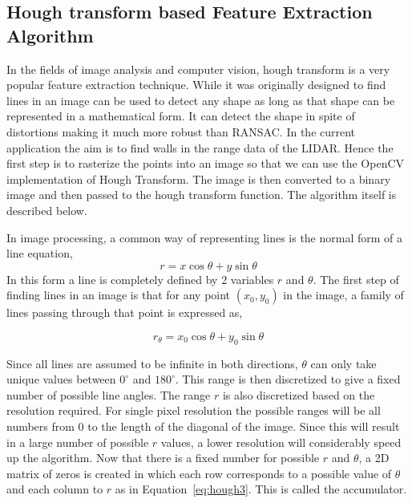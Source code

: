 \subsection{Hough transform based Feature Extraction Algorithm}
\label{sec:hough}
In the fields of image analysis and computer vision, hough transform is a very popular feature extraction technique\cite{Stockman2001}. While it was originally designed to find lines in an image can be used to detect any shape as long as that shape can be represented in a mathematical form\cite{Duda1972}. It can detect the shape in spite of distortions making it much more robust than RANSAC\cite{Hu1998}. In the current application the aim is to find walls in the range data of the LIDAR. Hence the first step is to rasterize the points into an image so that we can use the OpenCV implementation of Hough Transform. The image is then converted to a binary image and then passed to the hough transform function. The algorithm itself is described below.

In image processing, a common way of representing lines is the normal form of a line equation, 
\begin{equation}[h!]
r=x\cos\theta+y\sin\theta
\label{eq:hough1}
\end{equation}
In this form a line is completely defined by 2 variables $ r $ and  $ \theta $. The first step of finding lines in an image is that for any point $ (x_0,y_0) $ in the image, a family of lines passing through that point is expressed as,

\begin{equation}[h!]
r_\theta=x_0\cos\theta+y_0\sin\theta
\label{eq:hough2}
\end{equation}

Since all lines are assumed to be infinite in both directions, $ \theta $ can only take unique values between $ 0^\circ $ and $ 180^\circ $. This range is then discretized to give a fixed number of possible line angles. The range $ r $ is also discretized based on the resolution required. For single pixel resolution the possible ranges will be all numbers from 0 to the length of the diagonal of the image. Since this will result in a large number of possible $ r $ values, a lower resolution will considerably speed up the algorithm. Now that there is a fixed number for possible $ r $ and $ \theta $, a 2D matrix of zeros is created in which each row corresponds to a possible value of $ \theta $ and each column to $ r $ as in Equation~\ref{eq:hough3}. This is called the accumulator. 

